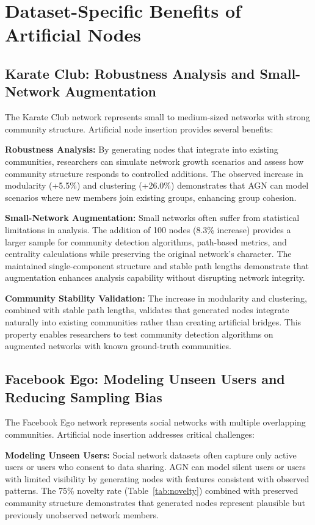 \documentclass[12pt]{article}
\begin{document}
\section{Dataset-Specific Benefits of Artificial Nodes}

\subsection{Karate Club: Robustness Analysis and Small-Network Augmentation}

The Karate Club network represents small to medium-sized networks with strong community structure. Artificial node insertion provides several benefits:

\textbf{Robustness Analysis:} By generating nodes that integrate into existing communities, researchers can simulate network growth scenarios and assess how community structure responds to controlled additions. The observed increase in modularity (+5.5\%) and clustering (+26.0\%) demonstrates that AGN can model scenarios where new members join existing groups, enhancing group cohesion.

\textbf{Small-Network Augmentation:} Small networks often suffer from statistical limitations in analysis. The addition of 100 nodes (8.3\% increase) provides a larger sample for community detection algorithms, path-based metrics, and centrality calculations while preserving the original network's character. The maintained single-component structure and stable path lengths demonstrate that augmentation enhances analysis capability without disrupting network integrity.

\textbf{Community Stability Validation:} The increase in modularity and clustering, combined with stable path lengths, validates that generated nodes integrate naturally into existing communities rather than creating artificial bridges. This property enables researchers to test community detection algorithms on augmented networks with known ground-truth communities.

\subsection{Facebook Ego: Modeling Unseen Users and Reducing Sampling Bias}

The Facebook Ego network represents social networks with multiple overlapping communities. Artificial node insertion addresses critical challenges:

\textbf{Modeling Unseen Users:} Social network datasets often capture only active users or users who consent to data sharing. AGN can model silent users or users with limited visibility by generating nodes with features consistent with observed patterns. The 75\% novelty rate (Table~\ref{tab:novelty}) combined with preserved community structure demonstrates that generated nodes represent plausible but previously unobserved network members.
\end{document}
